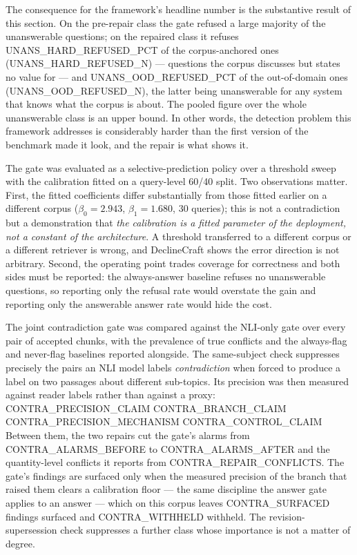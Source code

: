 \documentclass[preprint,3p,times]{elsarticle}
\begin{document}
The consequence for the framework's headline number is the substantive result
of this section. On the pre-repair class the gate refused a large majority of
the unanswerable questions; on the repaired class it refuses
{{UNANS_HARD_REFUSED_PCT}} of the corpus-anchored ones
({{UNANS_HARD_REFUSED_N}}) --- questions the corpus discusses but states no
value for --- and {{UNANS_OOD_REFUSED_PCT}} of the out-of-domain ones
({{UNANS_OOD_REFUSED_N}}), the latter being unanswerable for any system that
knows what the corpus is about. The pooled figure over the whole unanswerable
class is an upper bound. In other words, the detection problem this framework
addresses is considerably harder than the first version of the benchmark made
it look, and the repair is what shows it.


The gate was evaluated as a selective-prediction policy over a threshold sweep
with the calibration fitted on a query-level 60/40 split. Two observations
matter. First, the fitted coefficients differ substantially from those fitted
earlier on a different corpus ($\beta_0=2.943$, $\beta_1=1.680$, 30 queries);
this is not a contradiction but a demonstration that \emph{the calibration is a
fitted parameter of the deployment, not a constant of the architecture}. A
threshold transferred to a different corpus or a different retriever is wrong,
and DeclineCraft shows the error direction is not arbitrary. Second, the
operating point trades coverage for correctness and both sides must be reported:
the always-answer baseline refuses no unanswerable questions, so reporting only
the refusal rate would overstate the gain and reporting only the answerable
answer rate would hide the cost.

The joint contradiction gate was compared against the NLI-only gate over every
pair of accepted chunks, with the prevalence of true conflicts and the
always-flag and never-flag baselines reported alongside. The same-subject check
suppresses precisely the pairs an NLI model labels \emph{contradiction} when
forced to produce a label on two passages about different sub-topics. Its
precision was then measured against reader labels rather than against a proxy:
{{CONTRA_PRECISION_CLAIM}} {{CONTRA_BRANCH_CLAIM}} {{CONTRA_PRECISION_MECHANISM}}
{{CONTRA_CONTROL_CLAIM}} Between them, the two repairs cut the gate's alarms
from {{CONTRA_ALARMS_BEFORE}} to {{CONTRA_ALARMS_AFTER}} and the
quantity-level conflicts it reports from {{CONTRA_REPAIR_CONFLICTS}}. The
gate's findings are surfaced only when the
measured precision of the branch that raised them clears a calibration floor
--- the same discipline the answer gate applies to an answer --- which on this
corpus leaves {{CONTRA_SURFACED}} findings surfaced and {{CONTRA_WITHHELD}}
withheld. The
revision-supersession check suppresses a further class whose importance is not
a matter of degree.
\end{document}
